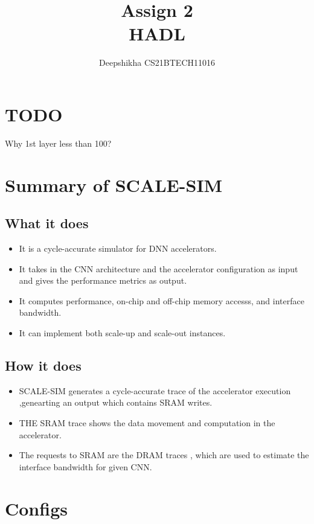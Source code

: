\documentclass[12pt]{article}
\title{
{\Huge{ Assign  2
\\
HADL}}
}
\date{}
\begin{document}
\author{
Deepshikha  CS21BTECH11016
}
\maketitle


\section{TODO}
Why 1st layer less than 100?

\section{Summary of SCALE-SIM}

\subsection{What it does}

\begin{itemize}
    \item It is a cycle-accurate simulator for DNN accelerators.
    \item It takes in the CNN architecture and the accelerator configuration as input and gives the performance metrics as output.
    \item It computes performance, on-chip and off-chip memory accesss, and interface bandwidth.
    \item It can implement both scale-up and scale-out instances.

\end{itemize}

\subsection{How it does}
\begin{itemize}
    \item SCALE-SIM generates a cycle-accurate trace of the accelerator execution ,genearting an output which contains SRAM writes.
    \item THE SRAM trace shows the data movement and computation in the accelerator.
    \item The requests to SRAM  are the DRAM traces , which are used to estimate the interface bandwidth for given CNN.
\end{itemize}


\section{Configs}
\end{document}
